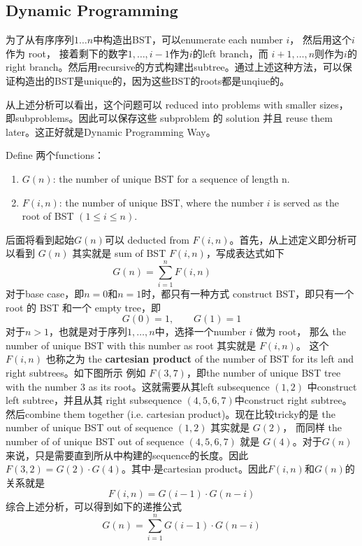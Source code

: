 \subsection{Dynamic Programming}
为了从有序序列$1\ldots n$中构造出BST，可以enumerate each number $i$， 然后用这个$i$作为 root， 接着剩下的数字$1, \ldots, i-1$作为$i$的left branch，而 $i+1, \ldots, n$则作为$i$的right branch。然后用recursive的方式构建出subtree。通过上述这种方法，可以保证构造出的BST是unique的，因为这些BST的roots都是unqiue的。
\par
从上述分析可以看出，这个问题可以 reduced into problems with smaller sizes，即subproblems。因此可以保存这些 subproblem 的 solution 并且 reuse them later。这正好就是Dynamic Programming Way。
\par
Define 两个functions：
\begin{enumerate}
\item $G(n)$: the number of unique BST for a sequence of length n.
\item $F(i, n)$: the number of unique BST, where the number $i$ is served as the root of BST $(1 \leq i \leq n)$.
\end{enumerate}
后面将看到起始$G(n)$可以 deducted from $F(i, n)$。首先，从上述定义即分析可以看到 $G(n)$ 其实就是 sum of BST $F(i,n)$，写成表达式如下
\[
G(n) = \sum_{i=1}^{n} F(i, n) \qquad \qquad
\]
对于base case，即$n=0$和$n=1$时，都只有一种方式 construct BST，即只有一个 root 的 BST 和一个 empty tree，即
\[
G(0) = 1, \qquad G(1) = 1
\]
对于$n>1$，也就是对于序列$1, \ldots, n$中，选择一个number $i$ 做为 root， 那么 the number of unique BST with this number as root 其实就是 $F(i,n)$。 这个$F(i,n)$ 也称之为 the \textbf{cartesian product} of the number of BST for its left and right subtrees。如下图所示
例如 $F(3,7)$，即the number of unique BST tree with the number 3 as its root。这就需要从其left subsequence $(1,2)$ 中construct left subtree，并且从其 right subsequence $(4,5,6,7)$中construct right subtree。然后combine them together (i.e. cartesian product)。现在比较tricky的是 the number of unique BST out of sequence $(1,2)$ 其实就是 $G(2)$， 而同样  the number of of unique BST out of sequence $(4, 5, 6, 7)$ 就是 $G(4)$。对于$G(n)$来说，只是需要直到所从中构建的sequence的长度。因此$F(3,2) = G(2)\cdot G(4)$。其中$\cdot$是cartesian product。因此$F(i,n)$和$G(n)$的关系就是
\[
F(i,n) = G(i-1)\cdot G(n-i)
\]
综合上述分析，可以得到如下的递推公式
\[
G(n) = \sum\limits_{i=1}^{n}G(i-1) \cdot G(n-i)
\]
